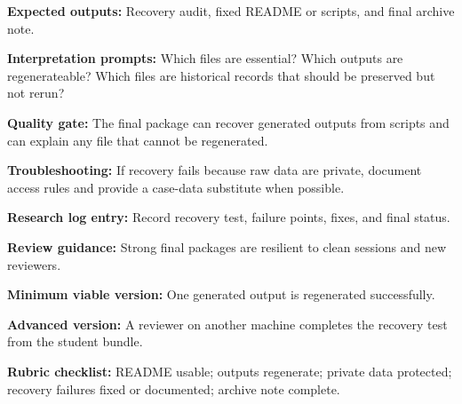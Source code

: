 \textbf{Expected outputs:} Recovery audit, fixed README or scripts, and final archive note.

\textbf{Interpretation prompts:} Which files are essential? Which outputs are regenerateable? Which files are historical records that should be preserved but not rerun?

\textbf{Quality gate:} The final package can recover generated outputs from scripts and can explain any file that cannot be regenerated.

\textbf{Troubleshooting:} If recovery fails because raw data are private, document access rules and provide a case-data substitute when possible.

\textbf{Research log entry:} Record recovery test, failure points, fixes, and final status.

\textbf{Review guidance:} Strong final packages are resilient to clean sessions and new reviewers.

\textbf{Minimum viable version:} One generated output is regenerated successfully.

\textbf{Advanced version:} A reviewer on another machine completes the recovery test from the student bundle.

\textbf{Rubric checklist:} README usable; outputs regenerate; private data protected; recovery failures fixed or documented; archive note complete.
